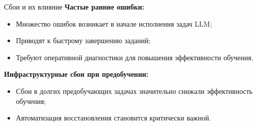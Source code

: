 \begin{frame}{Сбои и их влияние}
	\textbf{Частые ранние ошибки:}
	\begin{itemize}
		\item Множество ошибок возникает в начале исполнения задач LLM;
		\item Приводят к быстрому завершению заданий;
		\item Требуют оперативной диагностики для повышения эффективности обучения.
	\end{itemize}
	
	\textbf{Инфраструктурные сбои при предобучении:}
	\begin{itemize}
		\item Сбои в долгих предобучающих задачах значительно снижали эффективность обучения;
		\item Автоматизация восстановления становится критически важной.
	\end{itemize}
\end{frame}